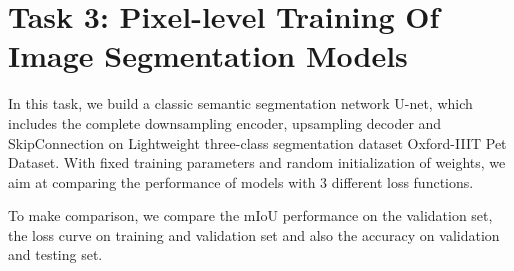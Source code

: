 \section{Task 3: Pixel-level Training Of Image Segmentation Models}

In this task, we build a classic semantic segmentation network U-net, which includes the complete downsampling encoder, upsampling decoder and SkipConnection on Lightweight three-class segmentation dataset Oxford-IIIT Pet Dataset. With fixed training parameters and random initialization of weights, we aim at comparing the performance of models with 3 different loss functions. 

To make comparison, we compare the mIoU performance on the validation set, the loss curve on training and validation set and also the accuracy on validation and testing set.







